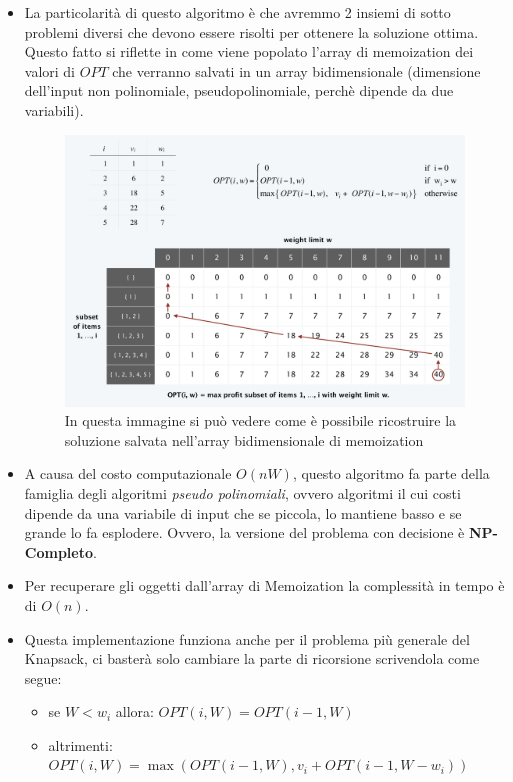 \begin{itemize}
  \item La particolarità di questo algoritmo è che avremmo 2 insiemi di sotto
        problemi diversi che devono essere risolti per ottenere la soluzione
        ottima. Questo fatto si riflette in come viene popolato l'array di
        memoization dei valori di $OPT$ che verranno salvati in un array
        bidimensionale (dimensione dell'input non polinomiale,
        pseudopolinomiale, perchè dipende da due variabili).

        \begin{figure}[H]
          \includegraphics[width=13cm, keepaspectratio]{capitoli/programmazione_dinamica/imgs/zaino1.png}
          \centering
          \caption{In questa immagine si può vedere come è possibile ricostruire la soluzione
            salvata nell'array bidimensionale di memoization}
        \end{figure}

  \item A causa del costo computazionale $O(nW)$, questo algoritmo fa parte
        della famiglia degli algoritmi \emph{pseudo polinomiali}, ovvero
        algoritmi il cui costi dipende da una variabile di input che se
        piccola, lo mantiene basso e se grande lo fa esplodere. Ovvero, la
        versione del problema con decisione è \textbf{NP-Completo}.
  \item Per recuperare gli oggetti dall'array di Memoization la complessità in
        tempo è di $O(n)$.
  \item Questa implementazione funziona anche per il problema più generale del
        Knapsack, ci basterà solo cambiare la parte di ricorsione scrivendola
        come segue:\\
        \begin{myblockquote}
          \begin{itemize}
            \item se $W < w_i$ allora: $OPT(i, W) = OPT(i-1,W)$
            \item altrimenti: \linebreak $OPT(i, W) = \max(OPT(i-1, W), v_i + OPT(i-1, W-w_i))$
          \end{itemize}
        \end{myblockquote}


\end{itemize}
